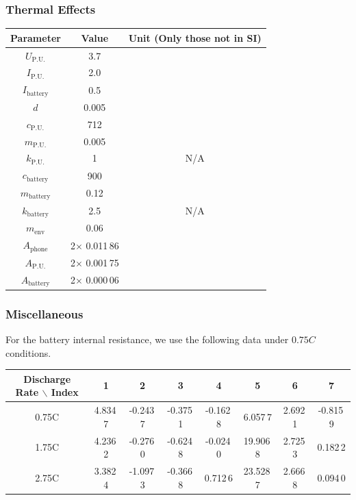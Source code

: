 \documentclass[12pt]{article}
\begin{document}
\subsubsection{Thermal Effects}

\begin{center}
\begin{tabular}{c|cc}
	\hline
	Parameter & Value & Unit (Only those not in SI) \\
	\hline
	$U_\mathrm{P.U.}$ & 3.7 & \\
	$I_\mathrm{P.U.}$ & 2.0 & \\
	$I_\mathrm{battery}$ & 0.5 & \\
	$d$ & 0.005 & \\
	$c_\mathrm{P.U.}$ & 712 & \\
	$m_\mathrm{P.U.}$ & 0.005 & \\
	$k_\mathrm{P.U.}$ & 1 & N/A \\
	$c_\mathrm{battery}$ & 900 & \\
	$m_\mathrm{battery}$ & 0.12 & \\
	$k_\mathrm{battery}$ & 2.5 & N/A \\
	$m_\mathrm{env}$ & 0.06 & \\
	$A_\mathrm{phone}$ & 2$\times$ 0.011\,86 & \\
	$A_\mathrm{P.U.}$ & 2$\times$ 0.001\,75 & \\
	$A_\mathrm{battery}$ & 2$\times$ 0.000\,06 & \\
	\hline
\end{tabular}
\end{center}

\subsubsection{Miscellaneous}

For the battery internal resistance, we use the following data under $0.75C$ conditions.

\begin{center}
\begin{tabular}{c|ccccccc}
	\hline
	Discharge Rate $\backslash$ Index & 1 & 2 & 3 & 4 & 5 & 6 & 7 \\
	\hline
	0.75C & 4.834\,7 & -0.243\,7 & -0.375\,1 & -0.162\,8 & 6.057\,7 & 2.692\,1 & -0.815\,9 \\
	1.75C & 4.236\,2 & -0.276\,0 & -0.624\,8 & -0.024\,0 & 19.906\,8 & 2.725\,3 & 0.182\,2 \\
	2.75C & 3.382\,4 & -1.097\,3 & -0.366\,8 & 0.712\,6 & 23.528\,7 & 2.666\,8 & 0.094\,0 \\
	\hline
\end{tabular}
\end{center}
\end{document}
